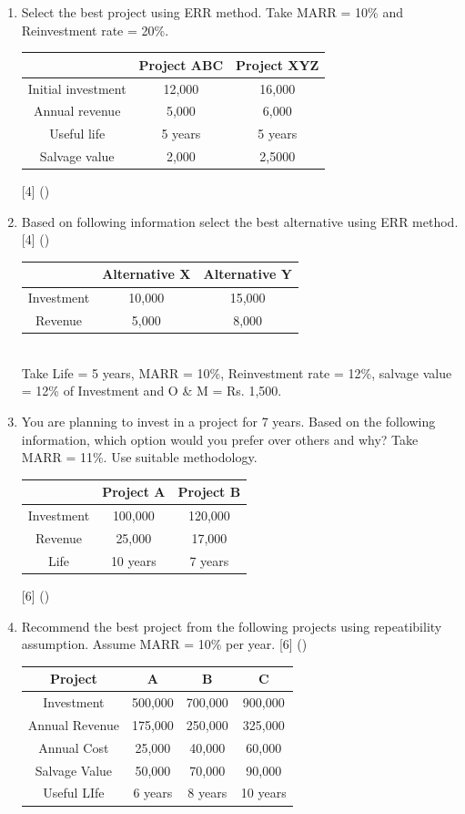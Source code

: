 \documentclass[12pt]{article}
\begin{document}
\begin{enumerate}[noitemsep, topsep=0pt]
		\item Select the best project using ERR method. Take MARR = 10\% and Reinvestment rate = 20\%.\\
		\begin{tabular}{|c|c|c|}
			\hline
			& Project ABC & Project XYZ \\ \hline
			Initial investment & 12,000 & 16,000 \\ \hline
			Annual revenue & 5,000 & 6,000 \\ \hline
			Useful life & 5 years & 5 years \\ \hline
			Salvage value & 2,000 & 2,5000 \\ \hline		
		\end{tabular}  \hfill [4] ()
		
		\item Based on following information select the best alternative using ERR method. \hfill [4] ()\\
		\begin{tabular}{|c|c|c|}
			\hline
			& Alternative X & Alternative Y \\ \hline
			Investment & 10,000 & 15,000 \\ \hline
			Revenue & 5,000 & 8,000 \\ \hline
		\end{tabular}\\
		Take Life = 5 years, MARR = 10\%, Reinvestment rate = 12\%, salvage value = 12\% of Investment and O \& M = Rs. 1,500.
		
		\item You are planning to invest in a project for 7 years. Based on the following information, which option would you prefer over others and why? Take MARR = 11\%. Use suitable methodology. 
		\begin{tabular}{|c|c|c|}
			\hline
			& Project A & Project B \\ \hline
			Investment & 100,000 & 120,000 \\ \hline
			Revenue & 25,000 & 17,000 \\ \hline
			Life & 10 years & 7 years \\ \hline
		\end{tabular}\hfill [6] ()
		
		\item Recommend the best project from the following projects using repeatibility assumption. Assume MARR = 10\% per year. \hfill [6] ()\\
		\begin{tabular}{|c|c|c|c|}
			\hline
			Project & A & B & C \\ \hline
			Investment & 500,000 & 700,000 & 900,000 \\ \hline
			Annual Revenue & 175,000 & 250,000 & 325,000 \\ \hline
			Annual Cost & 25,000 & 40,000 & 60,000 \\ \hline
			Salvage Value & 50,000 & 70,000 & 90,000 \\ \hline
			Useful LIfe & 6 years & 8 years & 10 years \\ \hline
		\end{tabular}
		

\end{enumerate}
\end{document}
